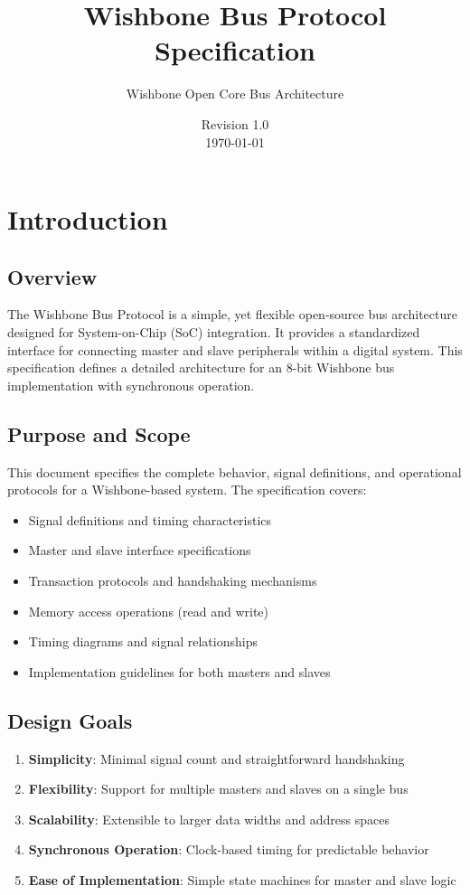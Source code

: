 \documentclass[12pt,a4paper]{article}
\title{\textbf{Wishbone Bus Protocol Specification}}
\author{Wishbone Open Core Bus Architecture}
\date{Revision 1.0 \\ \today}
\begin{document}
\maketitle

\newpage
\tableofcontents
\newpage

\section{Introduction}

\subsection{Overview}
The Wishbone Bus Protocol is a simple, yet flexible open-source bus architecture designed for System-on-Chip (SoC) integration. It provides a standardized interface for connecting master and slave peripherals within a digital system. This specification defines a detailed architecture for an 8-bit Wishbone bus implementation with synchronous operation.

\subsection{Purpose and Scope}
This document specifies the complete behavior, signal definitions, and operational protocols for a Wishbone-based system. The specification covers:
\begin{itemize}
    \item Signal definitions and timing characteristics
    \item Master and slave interface specifications
    \item Transaction protocols and handshaking mechanisms
    \item Memory access operations (read and write)
    \item Timing diagrams and signal relationships
    \item Implementation guidelines for both masters and slaves
\end{itemize}

\subsection{Design Goals}
\begin{enumerate}
    \item \textbf{Simplicity}: Minimal signal count and straightforward handshaking
    \item \textbf{Flexibility}: Support for multiple masters and slaves on a single bus
    \item \textbf{Scalability}: Extensible to larger data widths and address spaces
    \item \textbf{Synchronous Operation}: Clock-based timing for predictable behavior
    \item \textbf{Ease of Implementation}: Simple state machines for master and slave logic
\end{enumerate}
\end{document}
